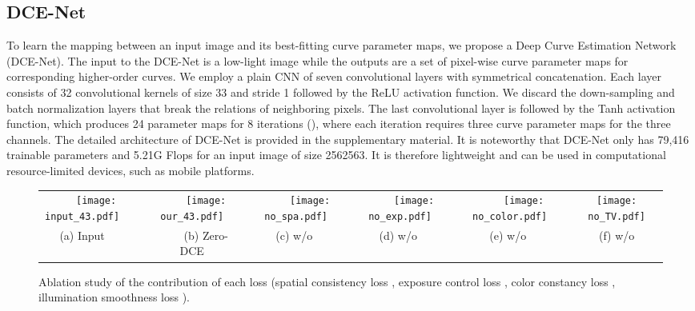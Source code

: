 \documentclass[10pt,twocolumn,letterpaper]{article}
\begin{document}
\subsection{DCE-Net}
To learn the mapping between an input image and its best-fitting curve parameter maps, we propose a Deep Curve Estimation Network (DCE-Net).
The input to the DCE-Net is a low-light image while the outputs are a set of pixel-wise curve parameter maps for corresponding higher-order curves.
We employ a plain CNN of seven convolutional layers with symmetrical concatenation. Each layer consists of 32 convolutional kernels of size 33 and stride 1 followed by the ReLU activation function. We discard the down-sampling and batch normalization layers that break the relations of neighboring pixels.
The last convolutional layer is followed by the Tanh activation function, which produces 24 parameter maps for 8 iterations (), where each iteration requires three curve parameter maps for the three channels.
The detailed architecture of DCE-Net is provided in the supplementary material.
It is noteworthy that DCE-Net only has 79,416 trainable parameters and 5.21G Flops for an input image of size 2562563. It is therefore lightweight and can be used in computational resource-limited devices, such as mobile platforms.

\begin{figure*}
	\begin{center}
		\begin{tabular}{c@{ }c@{ }c@{ }c@{ }c@{ }c@{ }c}
			\texttt{[image: input\_43.pdf]}~~~~~&
			\texttt{[image: our\_43.pdf]}~~~~~&
			\texttt{[image: no\_spa.pdf]}~~~~~&
			\texttt{[image: no\_exp.pdf]}~~~~~&
			\texttt{[image: no\_color.pdf]}~~~~~&
			\texttt{[image: no\_TV.pdf]}\\
			(a) Input~~~~~& (b) Zero-DCE~~~~~& (c) w/o ~~~~~& (d) w/o ~~~~~& (e) w/o ~~~~~& (f) w/o \\
		\end{tabular}
	\end{center}
	\vspace{-0.5cm}
	\caption{Ablation study of the contribution of each loss (spatial consistency loss , exposure control loss , color constancy loss , illumination smoothness loss ).}
	\label{fig:loss}
	\vspace{-0.4cm}
\end{figure*}
\end{document}
